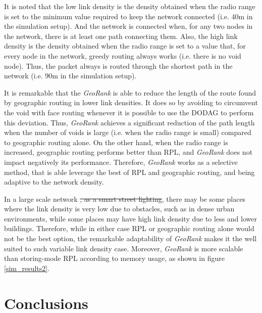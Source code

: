 \documentclass[final,authoryear,3p,twocolumn]{elsarticle}
\begin{document}
It is noted that the low link density is the density obtained when the radio range is set to the minimum value required to keep the network connected (i.e. 40m in the simulation setup). And the network is connected when, for any two nodes in the network, there is at least one path connecting them. Also, the high link density is the density obtained when the radio range is set to a value that, for every node in the network, greedy routing always works (i.e. there is no void node). Thus, the packet always is routed through the shortest path in the network (i.e. 90m in the simulation setup).

It is remarkable that the \textit{GeoRank} is able to reduce the length of the route found by geographic routing in lower link densities. It does so by avoiding to circumvent the void with face routing whenever it is possible to use the DODAG to perform this deviation. Thus, \textit{GeoRank} achieves a significant reduction of the path length when the number of voids is large (i.e. when the radio range is small) compared to geographic routing alone. On the other hand, when the radio range is increased, geographic routing performs better than RPL, and \textit{GeoRank} does not impact negatively its performance. Therefore, \textit{GeoRank} works as a selective method, that is able leverage the best of RPL and geographic routing, and being adaptive to the network density.

In a large scale network \sout{, as a smart street lighting}, there may be some places where the link density is very low due to obstacles, such as in dense urban environments, while some places may have high link density due to less and lower buildings. Therefore, while in either case RPL or geographic routing alone would not be the best option, the remarkable adaptability of \textit{GeoRank} makes it the well suited to such variable link density case. Moreover, \textit{GeoRank} is more scalable than storing-mode RPL according to memory usage, as shown in figure \ref{sim_results2}.

\section{Conclusions}
\label{secConclusion}
\end{document}
